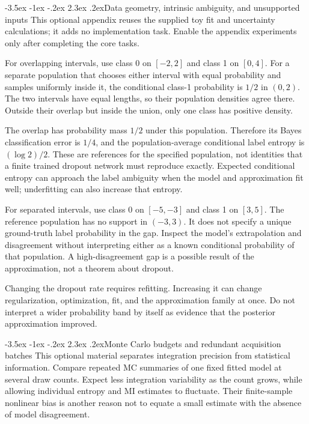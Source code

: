 \documentclass[11pt,a4paper]{article}
\makeatletter
\renewcommand\section{\@startsection{section}{1}{\z@}%
  {-3.5ex \@plus -1ex \@minus -.2ex}%
  {2.3ex \@plus .2ex}{\normalfont\Large}}
\makeatother
\begin{document}
\appendix
\section{Data geometry, intrinsic ambiguity, and unsupported inputs}
This optional appendix reuses the supplied toy fit and uncertainty calculations;
it adds no implementation task. Enable the appendix experiments only after
completing the core tasks.

For overlapping intervals, use class 0 on $[-2,2]$ and class 1 on $[0,4]$.
For a separate population that chooses either interval with equal probability
and samples uniformly inside it, the conditional class-1 probability is
$1/2$ in $(0,2)$. The two intervals have equal lengths, so their population
densities agree there. Outside their overlap but inside the union, only one
class has positive density.

The overlap has probability mass $1/2$ under this population. Therefore its
Bayes classification error is $1/4$, and the population-average conditional
label entropy is $(\log2)/2$. These are references for the specified population,
not identities that a finite trained dropout network must reproduce exactly.
Expected conditional entropy can approach the label ambiguity when the model
and approximation fit well; underfitting can also increase that entropy.

For separated intervals, use class 0 on $[-5,-3]$ and class 1 on $[3,5]$.
The reference population has no support in $(-3,3)$. It does not specify a
unique ground-truth label probability in the gap. Inspect the model's
extrapolation and disagreement without interpreting either as a known
conditional probability of that population. A high-disagreement gap is a
possible result of the approximation, not a theorem about dropout.

Changing the dropout rate requires refitting. Increasing it can change
regularization, optimization, fit, and the approximation family at once.
Do not interpret a wider probability band by itself as evidence that the
posterior approximation improved.

\section{Monte Carlo budgets and redundant acquisition batches}
This optional material separates integration precision from statistical
information. Compare repeated MC summaries of one fixed fitted model at
several draw counts. Expect less integration variability as the count grows,
while allowing individual entropy and MI estimates to fluctuate. Their
finite-sample nonlinear bias is another reason not to equate a small estimate
with the absence of model disagreement.
\end{document}
